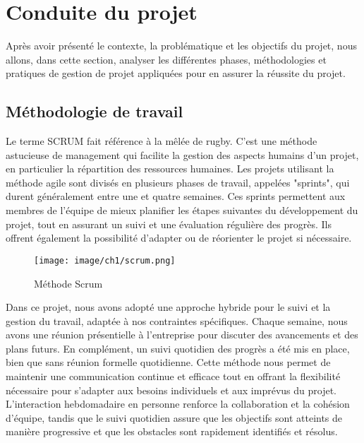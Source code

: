 \section{Conduite du projet}
Après avoir présenté le contexte, la problématique et les objectifs du projet, nous allons, dans cette section, analyser les différentes phases, méthodologies et pratiques de gestion de projet appliquées pour en assurer la réussite du projet.

\subsection{Méthodologie de travail}

Le terme SCRUM fait référence à la mêlée de rugby. C'est une méthode astucieuse de management qui facilite la gestion des aspects humains d'un projet, en particulier la répartition des ressources humaines. Les projets utilisant la méthode agile sont divisés en plusieurs phases de travail, appelées "sprints", qui durent généralement entre une et quatre semaines. Ces sprints permettent aux membres de l'équipe de mieux planifier les étapes suivantes du développement du projet, tout en assurant un suivi et une évaluation régulière des progrès. Ils offrent également la possibilité d'adapter ou de réorienter le projet si nécessaire.\cite{2}

\begin{figure}[H]
\begin{center}
\texttt{[image: image/ch1/scrum.png]}
\end{center}
\caption{Méthode Scrum}
\end{figure}


Dans ce projet, nous avons adopté une approche hybride pour le suivi et la gestion du travail, adaptée à nos contraintes spécifiques. Chaque semaine, nous avons une réunion présentielle à l'entreprise pour discuter des avancements et des plans futurs. En complément, un suivi quotidien des progrès a été mis en place, bien que sans réunion formelle quotidienne. Cette méthode nous permet de maintenir une communication continue et efficace tout en offrant la flexibilité nécessaire pour s'adapter aux besoins individuels et aux imprévus du projet. L'interaction hebdomadaire en personne renforce la collaboration et la cohésion d'équipe, tandis que le suivi quotidien assure que les objectifs sont atteints de manière progressive et que les obstacles sont rapidement identifiés et résolus.

